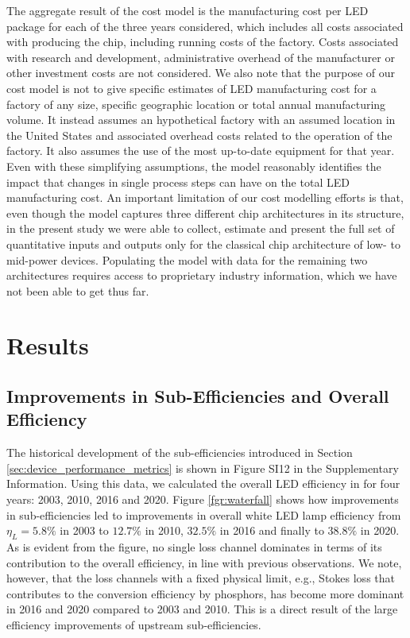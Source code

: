 \documentclass[journal=jacsat,manuscript=article]{achemso}
\begin{document}
The aggregate result of the cost model is the manufacturing cost per LED package for each of the three years considered, which includes all costs associated with producing the chip, including running costs of the factory. Costs associated with research and development, administrative overhead of the manufacturer or other investment costs are not considered. We also note that the purpose of our cost model is not to give specific estimates of LED manufacturing cost for a factory of any size, specific geographic location or total annual manufacturing volume. It instead assumes an hypothetical factory with an assumed location in the United States and associated overhead costs related to the operation of the factory. It also assumes the use of the most up-to-date equipment for that year. Even with these simplifying assumptions, the model reasonably identifies the impact that changes in single process steps can have on the total LED manufacturing cost. An important limitation of our cost modelling efforts is that, even though the model captures three different chip architectures in its structure, in the present study we were able to collect, estimate and present the full set of quantitative inputs and outputs only for the classical chip architecture of low- to mid-power devices. Populating the model with data for the remaining two architectures requires access to proprietary industry information, which we have not been able to get thus far. 

\clearpage
\section{Results}

\subsection{Improvements in Sub-Efficiencies and Overall Efficiency}

The historical development of the sub-efficiencies introduced in Section \ref{sec:device_performance_metrics} is shown in Figure SI12 in the Supplementary Information. Using this data, we calculated the overall LED efficiency in for four years: 2003, 2010, 2016 and 2020. Figure \ref{fgr:waterfall} shows how improvements in sub-efficiencies led to improvements in overall white LED lamp efficiency from $\eta_L=5.8\%$ in 2003 to $12.7\%$ in 2010, $32.5\%$ in 2016 and finally to $38.8\%$ in 2020. As is evident from the figure, no single loss channel dominates in terms of its contribution to the overall efficiency, in line with previous observations\cite{tsao2010solid}. We note, however, that the loss channels with a fixed physical limit, e.g., Stokes loss that contributes to the conversion efficiency by phosphors, has become more dominant in 2016 and 2020 compared to 2003 and 2010. This is a direct result of the large efficiency improvements of upstream sub-efficiencies.
\end{document}
